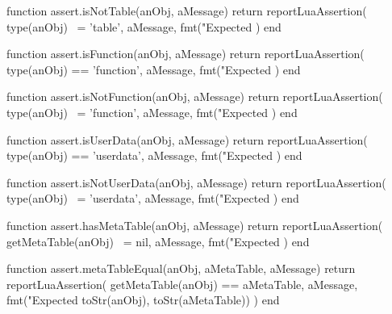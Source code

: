 \stopTestSuite


\startLuaCode
function assert.isNotTable(anObj, aMessage)
  return reportLuaAssertion(
    type(anObj) ~= 'table',
    aMessage,
    fmt("Expected %
  )
end
\stopLuaCode

\stopTestSuite


\startLuaCode
function assert.isFunction(anObj, aMessage)
  return reportLuaAssertion(
    type(anObj) == 'function',
    aMessage,
    fmt("Expected %
  )
end
\stopLuaCode

\stopTestSuite


\startLuaCode
function assert.isNotFunction(anObj, aMessage)
  return reportLuaAssertion(
    type(anObj) ~= 'function',
    aMessage,
    fmt("Expected %
  )
end
\stopLuaCode

\stopTestSuite


\startLuaCode
function assert.isUserData(anObj, aMessage)
  return reportLuaAssertion(
    type(anObj) == 'userdata',
    aMessage,
    fmt("Expected %
  )
end
\stopLuaCode
\stopTestSuite


\startLuaCode
function assert.isNotUserData(anObj, aMessage)
  return reportLuaAssertion(
    type(anObj) ~= 'userdata',
    aMessage,
    fmt("Expected %
  )
end
\stopLuaCode

\stopTestSuite


\startLuaCode
function assert.hasMetaTable(anObj, aMessage)
  return reportLuaAssertion(
    getMetaTable(anObj) ~= nil,
    aMessage,
    fmt("Expected %
  )
end
\stopLuaCode

\stopTestSuite


\startLuaCode
function assert.metaTableEqual(anObj, aMetaTable, aMessage)
  return reportLuaAssertion(
    getMetaTable(anObj) == aMetaTable,
    aMessage,
    fmt("Expected %
      toStr(anObj), toStr(aMetaTable))
  )
end
\stopLuaCode

